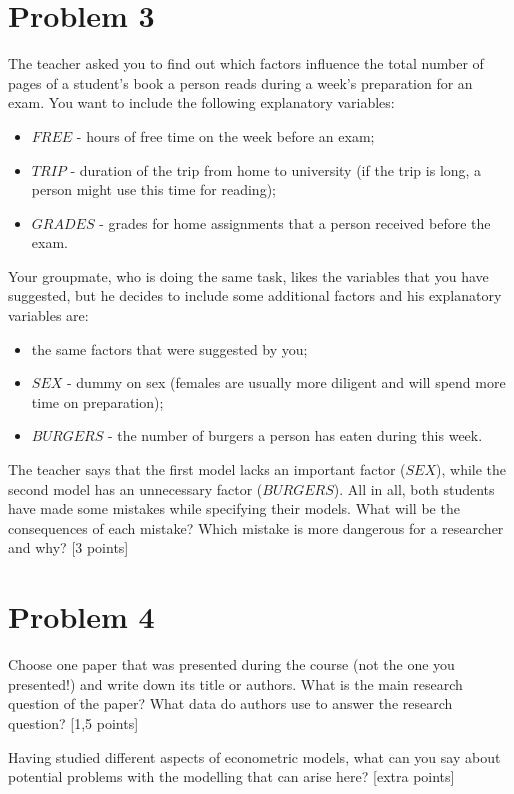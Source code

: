 \documentclass[12pt,letterpaper]{article}
\begin{document}
\section*{Problem 3}
The teacher asked you to find out which factors influence the total number of pages of a student's book a person reads during a week's preparation for an exam. You want to include the following explanatory variables:

\begin{itemize}
    \item $FREE$ - hours of free time on the week before an exam;
    \item $TRIP$ - duration of the trip from home to university (if the trip is long, a person might use this time for reading);
    \item $GRADES$ - grades for home assignments that a person received before the exam.
\end{itemize}

Your groupmate, who is doing the same task, likes the variables that you have suggested, but he decides to include some additional factors and his explanatory variables are:

\begin{itemize}
    \item the same factors that were suggested by you;
    \item $SEX$ - dummy on sex (females are usually more diligent and will spend more time on preparation);
    \item $BURGERS$ - the number of burgers a person has eaten during this week.
\end{itemize}

The teacher says that the first model lacks an important factor ($SEX$), while the second model has an unnecessary factor ($BURGERS$). All in all, both students have made some mistakes while specifying their models.
What will be the consequences of each mistake? Which mistake is more dangerous for a researcher and why? [3 points]

\medskip
\section*{Problem 4}

Choose one paper that was presented during the course (not the one you presented!) and write down its title or authors. What is the main research question of the paper? What data do authors use to answer the research question? [1,5 points]

Having studied different aspects of econometric models, what can you say about potential problems with the modelling that can arise here? [extra points]
\end{document}
